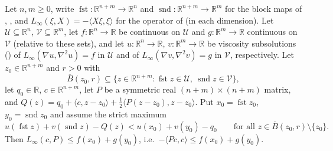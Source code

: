 \begin{lemma}
Let $n,m\ge0$, write $\operatorname{fst}:\mathbb R^{n+m}\to\mathbb R^n$ and $\operatorname{snd}:\mathbb R^{n+m}\to\mathbb R^m$ for the block maps of , , and $L_\infty(\xi,X)=-\langle X\xi,\xi\rangle$ for the operator of  (in each dimension). Let $\mathcal U\subseteq\mathbb R^n$, $\mathcal V\subseteq\mathbb R^m$, let $f:\mathbb R^n\to\mathbb R$ be continuous on $\mathcal U$ and $g:\mathbb R^m\to\mathbb R$ continuous on $\mathcal V$ (relative to these sets), and let $u:\mathbb R^n\to\mathbb R$, $v:\mathbb R^m\to\mathbb R$ be viscosity subsolutions () of $L_\infty(\nabla u,\nabla^2u)=f$ in $\mathcal U$ and of $L_\infty(\nabla v,\nabla^2v)=g$ in $\mathcal V$, respectively. Let $z_0\in\mathbb R^{n+m}$ and $r>0$ with
\[
\overline B(z_0,r)\subseteq\{z\in\mathbb R^{n+m}:\operatorname{fst}z\in\mathcal U,\ \operatorname{snd}z\in\mathcal V\},
\]
let $q_0\in\mathbb R$, $c\in\mathbb R^{n+m}$, let $P$ be a symmetric real $(n+m)\times(n+m)$ matrix, and $Q(z)=q_0+\langle c,z-z_0\rangle+\frac12\langle P(z-z_0),z-z_0\rangle$. Put $x_0=\operatorname{fst}z_0$, $y_0=\operatorname{snd}z_0$ and assume the strict maximum
\[
u(\operatorname{fst}z)+v(\operatorname{snd}z)-Q(z)<u(x_0)+v(y_0)-q_0\qquad\text{for all }z\in\overline B(z_0,r)\setminus\{z_0\}.
\]
Then $L_\infty(c,P)\le f(x_0)+g(y_0)$, i.e.\ $-\langle Pc,c\rangle\le f(x_0)+g(y_0)$.
\end{lemma}
